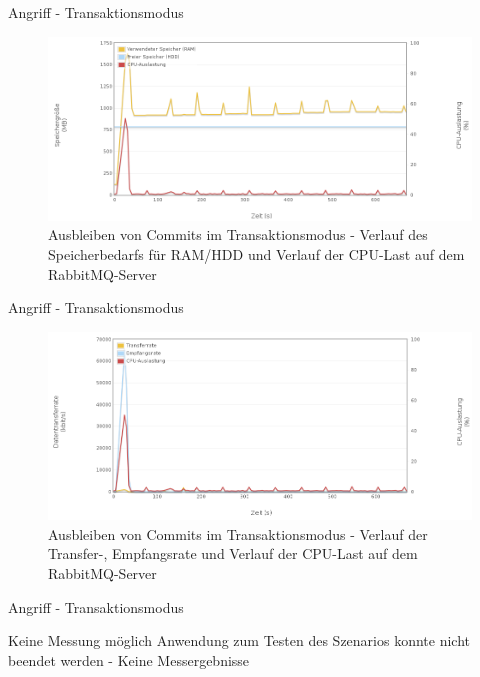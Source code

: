 \documentclass[10pt]{beamer}
\begin{document}
\begin{frame}{Angriff - Transaktionsmodus}
\begin{figure}[!htb]
	\centering
	\includegraphics[width=\textwidth]{img/tx/tx_server1.png}
	\caption{\centering Ausbleiben von Commits im Transaktionsmodus - Verlauf des Speicherbedarfs für RAM/HDD und Verlauf der CPU-Last auf dem RabbitMQ-Server}
	\label{fig:tx-server1}
\end{figure}
\end{frame}

\begin{frame}{Angriff - Transaktionsmodus}		
\begin{figure}[!htb]
	\centering
	\includegraphics[width=\textwidth]{img/tx/tx_server2.png}
	\caption{\centering Ausbleiben von Commits im Transaktionsmodus - Verlauf der Transfer-, Empfangsrate und Verlauf der CPU-Last auf dem RabbitMQ-Server}
	\label{fig:tx-server2}
\end{figure}
\end{frame}

\begin{frame}{Angriff - Transaktionsmodus}	
\begin{block}{Keine Messung möglich}
Anwendung zum Testen des Szenarios konnte nicht beendet werden - Keine Messergebnisse
\end{block}
\end{frame}
\end{document}
